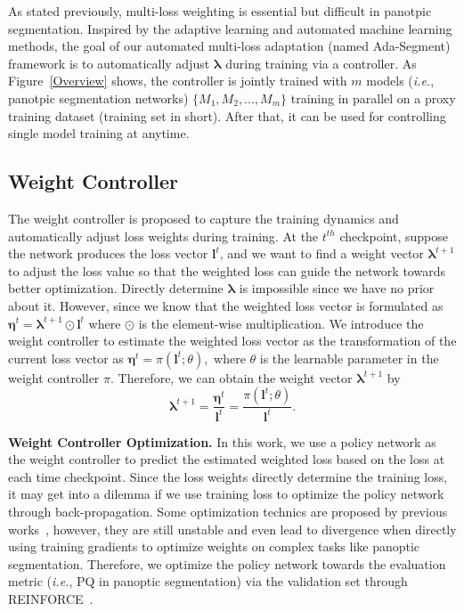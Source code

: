 \documentclass[letterpaper]{article} \usepackage{aaai21}  \usepackage{times}  \usepackage{helvet} \usepackage{courier}  \usepackage[hyphens]{url}  \usepackage{graphicx} \urlstyle{rm} \def\UrlFont{\rm}  \usepackage{natbib}  \usepackage{caption} \frenchspacing  \setlength{\pdfpagewidth}{8.5in}  \setlength{\pdfpageheight}{11in}
\begin{document}
 As stated previously, multi-loss weighting is essential but difficult in panotpic segmentation.
 Inspired by the adaptive learning and automated machine learning methods,
 the goal of our automated multi-loss adaptation (named Ada-Segment)
 framework is to automatically adjust $\boldsymbol{\lambda}$ during training via a controller. 
 As Figure~\ref{Overview} shows, the controller is jointly trained 
 with $m$ models (\textit{i.e.}, panotpic segmentation networks) $\{M_1, M_2, ..., M_m \}$ 
 training in parallel on a proxy training dataset (training set in short).
 After that, it can be used for controlling single model training at anytime. 
 






 
 \subsection{Weight Controller}
 \label{sec:w-gen}
The weight controller is proposed to capture the training dynamics 
 and automatically adjust loss weights during training. 
At the $t^{th}$ checkpoint, suppose the network produces the loss vector $\boldsymbol{l}^t$, 
 and we want to find a weight vector $\boldsymbol{\lambda}^{t+1}$ to adjust the loss value 
 so that the weighted loss can guide the network towards better optimization. 
 Directly determine $\boldsymbol{\lambda}$ is impossible since we have no prior about it. 
 However, since we know that the weighted loss vector is formulated as 
 $\boldsymbol{\eta}^t=\boldsymbol{\lambda}^{t+1}\odot \boldsymbol{l}^t$
 where $\odot$ is the element-wise multiplication. 
We introduce the weight controller to estimate the weighted loss vector as the 
 transformation of the current loss vector as $\boldsymbol{\eta}^t=\pi(\boldsymbol{l}^t; \theta),$
where $\theta$ is the learnable parameter in the weight controller $\pi$. 
 Therefore, we can obtain the weight vector $\boldsymbol{\lambda}^{t+1}$ by 
 \begin{equation}\boldsymbol{\lambda}^{t+1}=\frac{\boldsymbol{\eta}^t}{\boldsymbol{l}^t}=
 \frac{\pi(\boldsymbol{l}^t; \theta)}{\boldsymbol{l}^t}.\label{eq:pred}\end{equation}

 \noindent
 \textbf{Weight Controller Optimization.}
 In this work, we use a policy network as the weight controller to predict the estimated weighted loss 
 based on the loss at each time checkpoint. 
Since the loss weights directly determine the training loss, it may get into a dilemma if we use 
 training loss to optimize the policy network through back-propagation. 
 Some optimization technics are proposed by previous works~\cite{kendall2018uncertainty,chen2017gradnorm}, 
 however, they are still unstable and even lead to divergence when 
 directly using training gradients to optimize weights on complex tasks like panoptic segmentation.
 Therefore, we optimize the policy network towards the evaluation metric 
 (\textit{i.e.}, PQ in panoptic segmentation) 
 via the validation set through REINFORCE~\cite{williams1992REINFORCE}.
\end{document}
